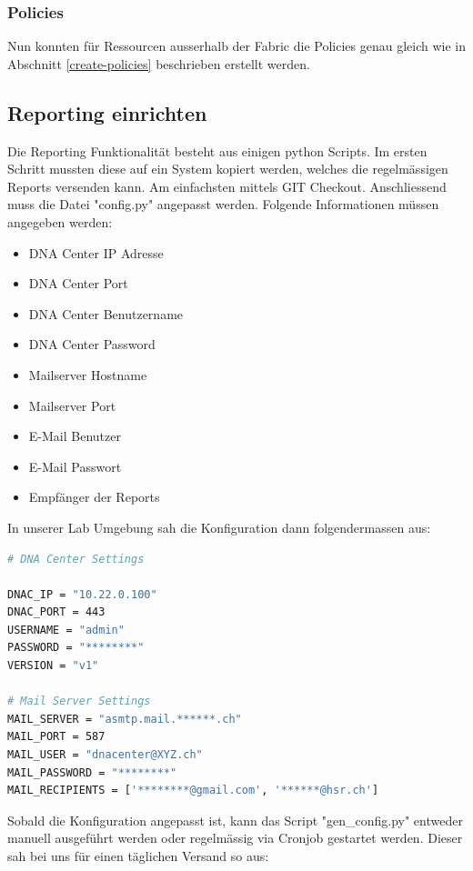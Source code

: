 \subsubsection{Policies}
Nun konnten für Ressourcen ausserhalb der Fabric die Policies genau gleich wie in Abschnitt \ref{create-policies} beschrieben erstellt werden.

\subsection{Reporting einrichten}

Die Reporting Funktionalität besteht aus einigen python Scripts. Im ersten Schritt mussten diese auf ein System kopiert werden, welches die regelmässigen Reports versenden kann. Am einfachsten mittels GIT Checkout.
Anschliessend muss die Datei "config.py" angepasst werden. Folgende Informationen müssen angegeben werden:
\begin{itemize}
	\item DNA Center IP Adresse
	\item DNA Center Port
	\item DNA Center Benutzername
	\item DNA Center Password
	\item Mailserver Hostname
	\item Mailserver Port
	\item E-Mail Benutzer
	\item E-Mail Passwort
	\item Empfänger der Reports
\end{itemize}


In unserer Lab Umgebung sah die Konfiguration dann folgendermassen aus:

\begin{lstlisting}[language=bash]
# DNA Center Settings

DNAC_IP = "10.22.0.100"
DNAC_PORT = 443
USERNAME = "admin"
PASSWORD = "********"
VERSION = "v1"

# Mail Server Settings
MAIL_SERVER = "asmtp.mail.******.ch"
MAIL_PORT = 587
MAIL_USER = "dnacenter@XYZ.ch"
MAIL_PASSWORD = "********"
MAIL_RECIPIENTS = ['********@gmail.com', '******@hsr.ch']
\end{lstlisting}

Sobald die Konfiguration angepasst ist, kann das Script "gen\_config.py" entweder manuell ausgeführt werden oder regelmässig via Cronjob gestartet werden. Dieser sah bei uns für einen täglichen Versand so aus:

